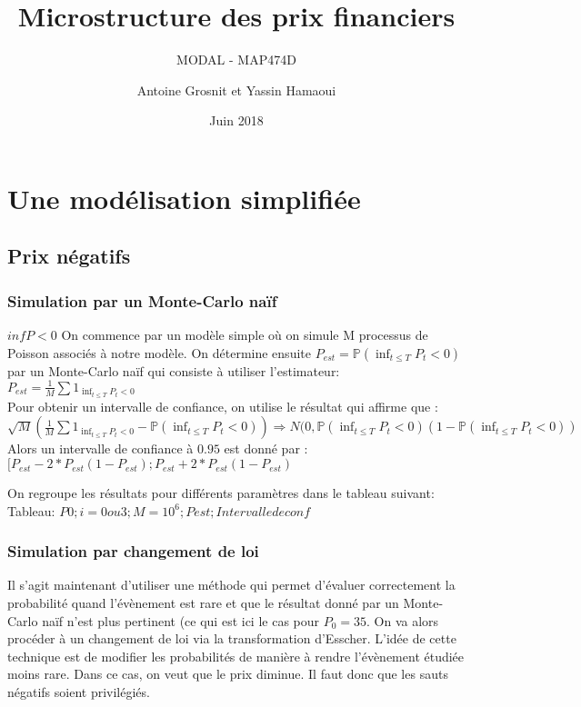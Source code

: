 \documentclass[a4paper,11pt]{article}
\title{Microstructure des prix financiers}
\author{Antoine Grosnit et Yassin Hamaoui}
\subtitle{MODAL - MAP474D}
\date{Juin 2018}
\begin{document}
\maketitle
\section{Une modélisation simplifiée}

\subsection{Prix négatifs}

\subsubsection{Simulation par un Monte-Carlo naïf}

$inf P<0$
On commence par un modèle simple où on simule M processus de Poisson associés à notre modèle. On détermine ensuite $P_{est}=\mathbb{P}(\inf_{t\leq T} P_{t}< 0)$ par un Monte-Carlo naïf qui consiste à utiliser l'estimateur: $P_{est}=\frac{1}{M}\sum 1_{ \inf_{t\leq T} P_{t}< 0}$ \\

Pour obtenir un intervalle de confiance, on utilise le résultat qui affirme que : 
$\sqrt{M}(\frac{1}{M}\sum 1_{ \inf_{t\leq T} P_{t}< 0}-\mathbb{P}(\inf_{t\leq T} P_{t}< 0)) \Rightarrow N(0,\mathbb{P}(\inf_{t\leq T} P_{t}< 0)(1-\mathbb{P}(\inf_{t\leq T} P_{t}< 0))$ \\

Alors un intervalle de confiance à $0.95$ est donné par : $[P_{est}-2*P_{est}(1-P_{est});P_{est}+2*P_{est}(1-P_{est})$ 


On regroupe les résultats pour différents paramètres dans le tableau suivant: \\
Tableau: $P0; i=0 ou 3 ;M=10^6; Pest; Intervalle de conf$



\subsubsection{Simulation par changement de loi}

Il s'agit maintenant d'utiliser une méthode qui permet d'évaluer correctement la probabilité quand l'évènement est rare et que le résultat donné par un Monte-Carlo naïf n'est plus pertinent (ce qui est ici le cas pour $P_{0}=35$. On va alors procéder à un changement de loi via la transformation d'Esscher. L'idée de cette technique est de modifier les probabilités de manière à rendre l'évènement étudiée moins rare. Dans ce cas, on veut que le prix diminue. Il faut donc que les sauts négatifs soient privilégiés. 
\end{document}
